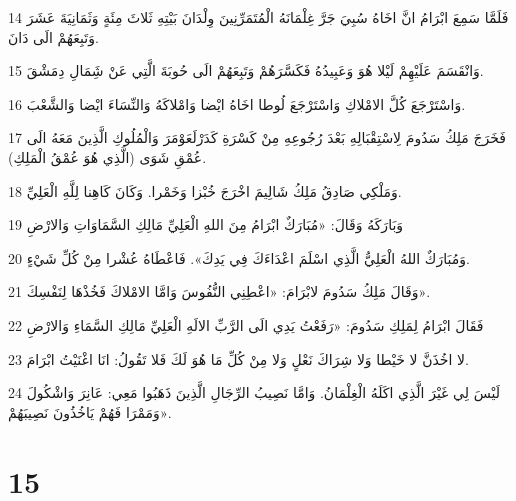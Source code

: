 \par 14 فَلَمَّا سَمِعَ ابْرَامُ انَّ اخَاهُ سُبِيَ جَرَّ غِلْمَانَهُ الْمُتَمَرِّنِينَ وِلْدَانَ بَيْتِهِ ثَلاثَ مِئَةٍ وَثَمَانِيَةَ عَشَرَ وَتَبِعَهُمْ الَى دَانَ.
\par 15 وَانْقَسَمَ عَلَيْهِمْ لَيْلا هُوَ وَعَبِيدُهُ فَكَسَّرَهُمْ وَتَبِعَهُمْ الَى حُوبَةَ الَّتِي عَنْ شَِمَالِ دِمَشْقَ.
\par 16 وَاسْتَرْجَعَ كُلَّ الامْلاكِ وَاسْتَرْجَعَ لُوطا اخَاهُ ايْضا وَامْلاكَهُ وَالنِّسَاءَ ايْضا وَالشَّعْبَ.
\par 17 فَخَرَجَ مَلِكُ سَدُومَ لِاسْتِقْبَالِهِ بَعْدَ رُجُوعِهِ مِنْ كَسْرَةِ كَدَرْلَعَوْمَرَ وَالْمُلُوكِ الَّذِينَ مَعَهُ الَى عُمْقِ شَوَى (الَّذِي هُوَ عُمْقُ الْمَلِكِ).
\par 18 وَمَلْكِي صَادِقُ مَلِكُ شَالِيمَ اخْرَجَ خُبْزا وَخَمْرا. وَكَانَ كَاهِنا لِلَّهِ الْعَلِيِّ.
\par 19 وَبَارَكَهُ وَقَالَ: «مُبَارَكٌ ابْرَامُ مِنَ اللهِ الْعَلِيِّ مَالِكِ السَّمَاوَاتِ وَالارْضِ
\par 20 وَمُبَارَكٌ اللهُ الْعَلِيُّ الَّذِي اسْلَمَ اعْدَاءَكَ فِي يَدِكَ». فَاعْطَاهُ عُشْرا مِنْ كُلِّ شَيْءٍ.
\par 21 وَقَالَ مَلِكُ سَدُومَ لابْرَامَ: «اعْطِنِي النُّفُوسَ وَامَّا الامْلاكَ فَخُذْهَا لِنَفْسِكَ».
\par 22 فَقَالَ ابْرَامُ لِمَلِكِ سَدُومَ: «رَفَعْتُ يَدِي الَى الرَّبِّ الالَهِ الْعَلِيِّ مَالِكِ السَّمَاءِ وَالارْضِ
\par 23 لا اخُذَنَّ لا خَيْطا وَلا شِرَاكَ نَعْلٍ وَلا مِنْ كُلِّ مَا هُوَ لَكَ فَلا تَقُولُ: انَا اغْنَيْتُ ابْرَامَ.
\par 24 لَيْسَ لِي غَيْرَ الَّذِي اكَلَهُ الْغِلْمَانُ. وَامَّا نَصِيبُ الرِّجَالِ الَّذِينَ ذَهَبُوا مَعِي: عَانِرَ وَاشْكُولَ وَمَمْرَا فَهُمْ يَاخُذُونَ نَصِيبَهُمْ».

\chapter{15}

